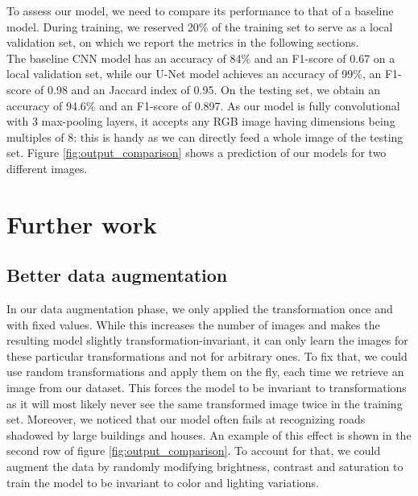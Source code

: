 \documentclass[10pt,conference,compsocconf]{IEEEtran}
\begin{document}
To assess our model, we need to compare its performance to that of a baseline model. During training, we reserved 20\% of the training set to serve as a local validation set, on which we report the metrics in the following sections.\\

The baseline CNN model has an accuracy of 84\% and an F1-score of 0.67 on a local validation set, while our U-Net model achieves an accuracy of 99\%, an F1-score of 0.98 and an Jaccard index of 0.95. On the testing set, we obtain an accuracy of 94.6\% and an F1-score of 0.897. As our model is fully convolutional with 3 max-pooling layers, it accepts any RGB image having dimensions being multiples of 8: this is handy as we can directly feed a whole image of the testing set. Figure \ref{fig:output_comparison} shows a prediction of our models for two different images. 

\section{Further work}

\subsection{Better data augmentation}
In our data augmentation phase, we only applied the transformation once and with fixed values. While this increases the number of images and makes the resulting model slightly transformation-invariant, it can only learn the images for these particular transformations and not for arbitrary ones. To fix that, we could use random transformations and apply them on the fly, each time we retrieve an image from our dataset. This forces the model to be invariant to transformations as it will most likely never see the same transformed image twice in the training set. Moreover, we noticed that our model often fails at recognizing roads shadowed by large buildings and houses. An example of this effect is shown in the second row of figure \ref{fig:output_comparison}. To account for that, we could augment the data by randomly modifying brightness, contrast and saturation to train the model to be invariant to color and lighting variations.    
\end{document}
